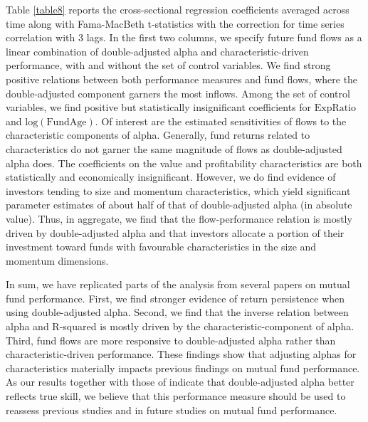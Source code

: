\par 
Table \ref{table8} reports the cross-sectional regression coefficients averaged across time along with Fama-MacBeth t-statistics with the \citet{newey1986simple} correction for time series correlation with 3 lags. In the first two columns, we specify future fund flows as a linear combination of double-adjusted alpha and characteristic-driven performance, with and without the set of control variables. We find strong positive relations between both performance measures and fund flows, where the double-adjusted component garners the most inflows. Among the set of control variables, we find positive but statistically insignificant coefficients for $\text{ExpRatio}$ and $\text{log}(\text{FundAge})$.
Of interest are the estimated sensitivities of flows to the characteristic components of alpha. Generally, fund returns related to characteristics do not garner the same magnitude of flows as double-adjusted alpha does. The coefficients on the value and profitability characteristics are both statistically and economically insignificant. However, we do find evidence of investors tending to size and momentum characteristics, which yield significant parameter estimates of about half of that of double-adjusted alpha (in absolute value).  Thus, in aggregate, we find that the flow-performance relation is mostly driven by double-adjusted alpha and that investors allocate a portion of their investment toward funds with favourable characteristics in the size and momentum dimensions. 
\par In sum, we have replicated parts of the analysis from several papers on mutual fund performance. First, we find stronger evidence of return persistence when using double-adjusted alpha. Second, we find that the inverse relation between alpha and R-squared is mostly driven by the characteristic-component of alpha. Third, fund flows are more responsive to double-adjusted alpha rather than characteristic-driven performance. These findings show that adjusting alphas for characteristics materially impacts previous findings on mutual fund performance. As our results together with those of \citet{busse2017double} indicate that double-adjusted alpha better reflects true skill, we believe that this performance measure should be used to reassess previous studies and in future studies on mutual fund performance. 